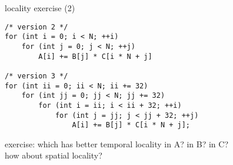 
\begin{frame}[fragile,label=localityExercise2]{locality exercise (2)}
\lstset{language=C,style=small}
\begin{lstlisting}
/* version 2 */
for (int i = 0; i < N; ++i)
    for (int j = 0; j < N; ++j)
        A[i] += B[j] * C[i * N + j]

/* version 3 */
for (int ii = 0; ii < N; ii += 32)
    for (int jj = 0; jj < N; jj += 32)
        for (int i = ii; i < ii + 32; ++i)
            for (int j = jj; j < jj + 32; ++j)
                A[i] += B[j] * C[i * N + j];
\end{lstlisting}
exercise: which has better temporal locality in A? in B? in C? \\
how about spatial locality?
\end{frame}

